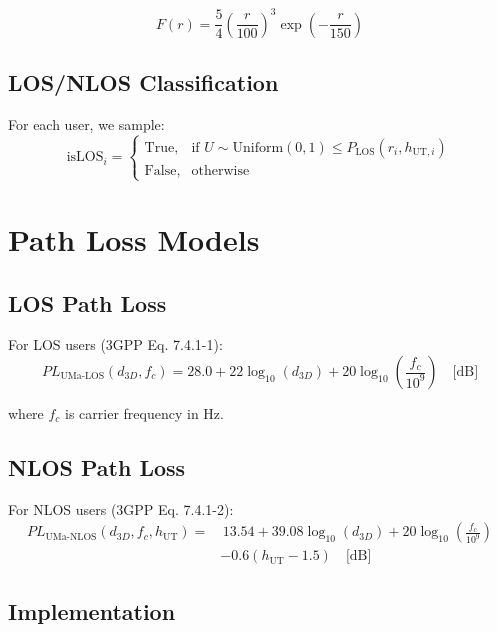 \begin{equation}
F(r) = \frac{5}{4} \left(\frac{r}{100}\right)^3 \exp\left(-\frac{r}{150}\right)
\end{equation}

\subsection{LOS/NLOS Classification}

For each user, we sample:
\begin{equation}
\text{isLOS}_i = \begin{cases}
\text{True}, & \text{if } U \sim \text{Uniform}(0,1) \leq P_{\text{LOS}}(r_i, h_{\text{UT},i}) \\
\text{False}, & \text{otherwise}
\end{cases}
\end{equation}

\section{Path Loss Models}

\subsection{LOS Path Loss}

For LOS users (3GPP Eq. 7.4.1-1):
\begin{equation}
PL_{\text{UMa-LOS}}(d_{3D}, f_c) = 28.0 + 22 \log_{10}(d_{3D}) + 20 \log_{10}\left(\frac{f_c}{10^9}\right) \quad \text{[dB]}
\end{equation}

where $f_c$ is carrier frequency in Hz.

\subsection{NLOS Path Loss}

For NLOS users (3GPP Eq. 7.4.1-2):
\begin{equation}
\begin{aligned}
PL_{\text{UMa-NLOS}}(d_{3D}, f_c, h_{\text{UT}}) = &\, 13.54 + 39.08 \log_{10}(d_{3D}) + 20 \log_{10}\left(\frac{f_c}{10^9}\right) \\
&- 0.6 (h_{\text{UT}} - 1.5) \quad \text{[dB]}
\end{aligned}
\end{equation}

\subsection{Implementation}

